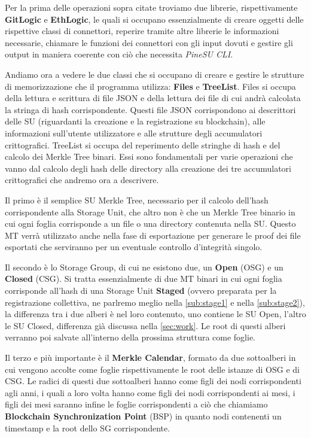 Per la prima delle operazioni sopra citate troviamo due librerie, rispettivamente \textbf{GitLogic} e \textbf{EthLogic}, le quali si occupano essenzialmente di creare oggetti delle rispettive classi di connettori, reperire tramite altre librerie le informazioni necessarie, chiamare le funzioni dei connettori con gli input dovuti e gestire gli output in maniera coerente con ciò che necessita \emph{PineSU CLI}.

Andiamo ora a vedere le due classi che si occupano di creare e gestire le strutture di memorizzazione che il programma utilizza: \textbf{Files} e \textbf{TreeList}.
Files si occupa della lettura e scrittura di file JSON e della lettura dei file di cui andrà calcolata la stringa di hash corrispondente. Questi file JSON corrispondono ai descrittori delle SU (riguardanti la creazione e la registrazione su blockchain), alle informazioni sull'utente utilizzatore e alle strutture degli accumulatori crittografici.
TreeList si occupa del reperimento delle stringhe di hash e del calcolo dei Merkle Tree binari.
Essi sono fondamentali per varie operazioni che vanno dal calcolo degli hash delle directory alla creazione dei tre accumulatori crittografici che andremo ora a descrivere.

Il primo è il semplice SU Merkle Tree, necessario per il calcolo dell'hash corrispondente alla Storage Unit, che altro non è che un Merkle Tree binario in cui ogni foglia corrisponde a un file o una directory contenuta nella SU. Questo MT verrà utilizzato anche nella fase di esportazione per generare le proof dei file esportati che serviranno per un eventuale controllo d'integrità singolo.

Il secondo è lo Storage Group, di cui ne esistono due, un \textbf{Open} (OSG) e un \textbf{Closed} (CSG). Si tratta essenzialmente di due MT binari in cui ogni foglia corrisponde all'hash di una Storage Unit \textbf{Staged} (ovvero preparata per la registrazione collettiva, ne parlremo meglio nella \autoref{sub:stage1} e nella \autoref{sub:stage2}), la differenza tra i due alberi è nel loro contenuto, uno contiene le SU Open, l'altro le SU Closed, differenza già discussa nella \autoref{sec:work}. Le root di questi alberi verranno poi salvate all'interno della prossima struttura come foglie.

Il terzo e più importante è il \textbf{Merkle Calendar}, formato da due sottoalberi in cui vengono accolte come foglie rispettivamente le root delle istanze di OSG e di CSG. Le radici di questi due sottoalberi hanno come figli dei nodi corrispondenti agli anni, i quali a loro volta hanno come figli dei nodi corrispondenti ai mesi, i figli dei mesi saranno infine le foglie corrispondenti a ciò che chiamiamo \textbf{Blockchain Synchronization Point} (BSP) in quanto nodi contenenti un timestamp e la root dello SG corrispondente.

